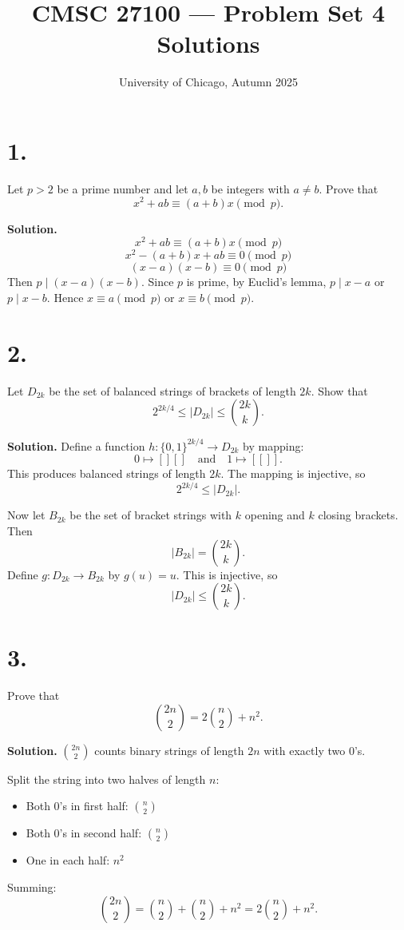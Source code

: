 \documentclass[11pt]{article}
\title{CMSC 27100 --- Problem Set 4 Solutions}
\date{University of Chicago, Autumn 2025}
\begin{document}
\maketitle

\section*{1.}
Let $p > 2$ be a prime number and let $a, b$ be integers with $a \ne b$. Prove that
\[
x^2 + ab \equiv (a + b)x \pmod{p}.
\]

\textbf{Solution.}
\[
x^2 + ab \equiv (a + b)x \pmod{p}
\]
\[
x^2 - (a + b)x + ab \equiv 0 \pmod{p}
\]
\[
(x - a)(x - b) \equiv 0 \pmod{p}
\]
Then $p \mid (x - a)(x - b)$. Since $p$ is prime, by Euclid's lemma,
$p \mid x - a$ or $p \mid x - b$. Hence $x \equiv a \pmod{p}$ or $x \equiv b \pmod{p}$.

\section*{2.}
Let $D_{2k}$ be the set of balanced strings of brackets of length $2k$. Show that
\[
2^{2k/4} \le |D_{2k}| \le \binom{2k}{k}.
\]

\textbf{Solution.}
Define a function $h : \{0,1\}^{2k/4} \to D_{2k}$ by mapping:
\[
0 \mapsto [][] \quad \text{and} \quad 1 \mapsto [[]].
\]
This produces balanced strings of length $2k$. The mapping is injective, so
\[
2^{2k/4} \le |D_{2k}|.
\]

Now let $B_{2k}$ be the set of bracket strings with $k$ opening and $k$ closing brackets.
Then
\[
|B_{2k}| = \binom{2k}{k}.
\]
Define $g : D_{2k} \to B_{2k}$ by $g(u)=u$. This is injective, so
\[
|D_{2k}| \le \binom{2k}{k}.
\]

\section*{3.}
Prove that
\[
\binom{2n}{2} = 2\binom{n}{2} + n^2.
\]

\textbf{Solution.}
$\binom{2n}{2}$ counts binary strings of length $2n$ with exactly two $0$'s.

Split the string into two halves of length $n$:
\begin{itemize}
\item Both $0$'s in first half: $\binom{n}{2}$
\item Both $0$'s in second half: $\binom{n}{2}$
\item One in each half: $n^2$
\end{itemize}

Summing:
\[
\binom{2n}{2} = \binom{n}{2} + \binom{n}{2} + n^2 = 2\binom{n}{2} + n^2.
\]
\end{document}
